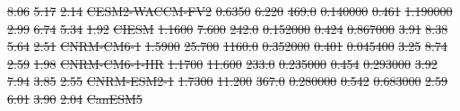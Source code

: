 \documentclass[gmd, manuscript]{copernicus}
\providecommand{\DIFdel}[1]{{\protect\color{red}\sout{#1}}}                      %
\providecommand{\DIFdelFL}[1]{\DIFdel{#1}} %
\begin{document}
\begin{table}[t]
{\DIFdelFL{8.06 }%
\DIFdelFL{5.17 }%
\DIFdelFL{2.14 }%
\DIFdelFL{CESM2-WACCM-FV2 }%
\DIFdelFL{0.6350 }%
\DIFdelFL{6.220 }%
\DIFdelFL{469.0 }%
\DIFdelFL{0.140000 }%
\DIFdelFL{0.461 }%
\DIFdelFL{1.190000 }%
\DIFdelFL{2.99 }%
\DIFdelFL{6.74 }%
\DIFdelFL{5.34 }%
\DIFdelFL{1.92 }%
\DIFdelFL{CIESM           }%
\DIFdelFL{1.1600 }%
\DIFdelFL{7.600 }%
\DIFdelFL{242.0 }%
\DIFdelFL{0.152000 }%
\DIFdelFL{0.424 }%
\DIFdelFL{0.867000 }%
\DIFdelFL{3.91 }%
\DIFdelFL{8.38 }%
\DIFdelFL{5.64 }%
\DIFdelFL{2.51 }%
\DIFdelFL{CNRM-CM6-1      }%
\DIFdelFL{1.5900 }%
\DIFdelFL{25.700 }%
\DIFdelFL{1160.0 }%
\DIFdelFL{0.352000 }%
\DIFdelFL{0.401 }%
\DIFdelFL{0.045400 }%
\DIFdelFL{3.25 }%
\DIFdelFL{8.74 }%
\DIFdelFL{2.59 }%
\DIFdelFL{1.98 }%
\DIFdelFL{CNRM-CM6-1-HR   }%
\DIFdelFL{1.1700 }%
\DIFdelFL{11.600 }%
\DIFdelFL{233.0 }%
\DIFdelFL{0.235000 }%
\DIFdelFL{0.454 }%
\DIFdelFL{0.293000 }%
\DIFdelFL{3.92 }%
\DIFdelFL{7.94 }%
\DIFdelFL{3.85 }%
\DIFdelFL{2.55 }%
\DIFdelFL{CNRM-ESM2-1     }%
\DIFdelFL{1.7300 }%
\DIFdelFL{11.200 }%
\DIFdelFL{367.0 }%
\DIFdelFL{0.280000 }%
\DIFdelFL{0.542 }%
\DIFdelFL{0.683000 }%
\DIFdelFL{2.59 }%
\DIFdelFL{6.01 }%
\DIFdelFL{3.90 }%
\DIFdelFL{2.04 }%
\DIFdelFL{CanESM5         }%
}
\end{table}
\end{document}
